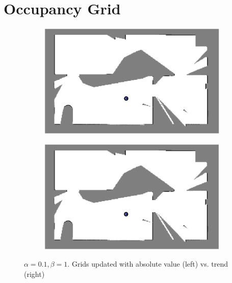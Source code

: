 \documentclass{article} %
\begin{document}
{} %

\section{Occupancy Grid} %

\begin{figure}[hbt]
  \centering
  \begin{subfigure}[b]{0.49\textwidth}
    \centering
    \includegraphics[width=\textwidth]{ass2_q1_a01b1.png}
  \end{subfigure}
  \hfill
  \begin{subfigure}[b]{0.49\textwidth}
    \centering
    \includegraphics[width=\textwidth]{ass2_q1_a01b1_post.png}
\end{subfigure}
\caption{$\alpha = 0.1, \beta = 1$. Grids updated with absolute value (left) vs. trend (right)}
\label{fig:q1_a1}
\end{figure}
\end{document}

